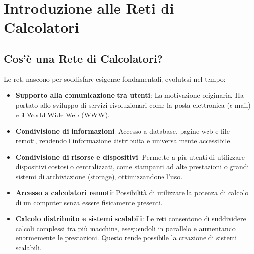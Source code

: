 \chapter{Introduzione alle Reti di Calcolatori}

\section{Cos'è una Rete di Calcolatori?}


Le reti nascono per soddisfare esigenze fondamentali, evolutesi nel tempo:
\begin{itemize}
    \item \textbf{Supporto alla comunicazione tra utenti}: La motivazione originaria. Ha portato allo sviluppo di servizi rivoluzionari come la posta elettronica (e-mail) e il World Wide Web (WWW).
    \item \textbf{Condivisione di informazioni}: Accesso a database, pagine web e file remoti, rendendo l'informazione distribuita e universalmente accessibile.
    \item \textbf{Condivisione di risorse e dispositivi}: Permette a più utenti di utilizzare dispositivi costosi o centralizzati, come stampanti ad alte prestazioni o grandi sistemi di archiviazione (storage), ottimizzandone l'uso.
    \item \textbf{Accesso a calcolatori remoti}: Possibilità di utilizzare la potenza di calcolo di un computer senza essere fisicamente presenti.
    \item \textbf{Calcolo distribuito e sistemi scalabili}: Le reti consentono di suddividere calcoli complessi tra più macchine, eseguendoli in parallelo e aumentando enormemente le prestazioni. Questo rende possibile la creazione di sistemi scalabili.
\end{itemize}


